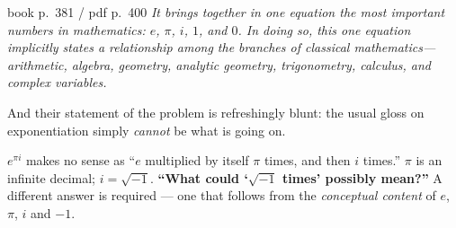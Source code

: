 \begin{bookquote}{book p.~381 / pdf p.~400}
\textit{It brings together in one equation the most important numbers in mathematics: $e$, $\pi$,
$i$, $1$, and $0$. In doing so, this one equation implicitly states a relationship among the
branches of classical mathematics---arithmetic, algebra, geometry, analytic geometry, trigonometry,
calculus, and complex variables.}
\end{bookquote}

\noindent And their statement of the problem is refreshingly blunt: the usual gloss on exponentiation
simply \emph{cannot} be what is going on.

\begin{warmbox}[title={The problem, stated precisely \normalfont\itshape(book p.~384 / pdf p.~403)}]
$e^{\pi i}$ makes no sense as ``$e$ multiplied by itself $\pi$ times, and then $i$ times.''
$\pi$ is an infinite decimal; $i=\sqrt{-1}$. \textbf{``What could `$\sqrt{-1}$ times' possibly mean?''}
A different answer is required --- one that follows from the \emph{conceptual content} of
$e$, $\pi$, $i$ and $-1$.
\end{warmbox}
